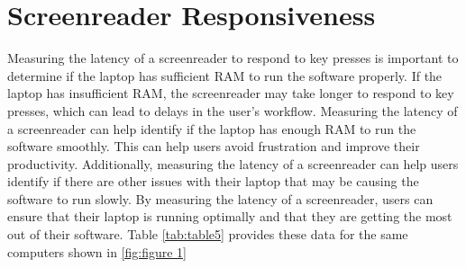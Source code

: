 \documentclass[14pt,letterpaper,twoside]{extreport}
\begin{document}
\pagebreak
	\hypertarget{screenreader-response}{}\section{Screenreader Responsiveness}\label{screenreader-response}
Measuring the latency of a screenreader to respond to key presses is important to determine if the laptop has sufficient RAM to run the software properly. If the laptop has insufficient RAM, the screenreader may take longer to respond to key presses, which can lead to delays in the user’s workflow. Measuring the latency of a screenreader can help identify if the laptop has enough RAM to run the software smoothly. This can help users avoid frustration and improve their productivity. Additionally, measuring the latency of a screenreader can help users identify if there are other issues with their laptop that may be causing the software to run slowly. By measuring the latency of a screenreader, users can ensure that their laptop is running optimally and that they are getting the most out of their software. Table \ref{tab:table5} provides these data for the same computers shown in \ref{fig:figure 1}
\end{document}
